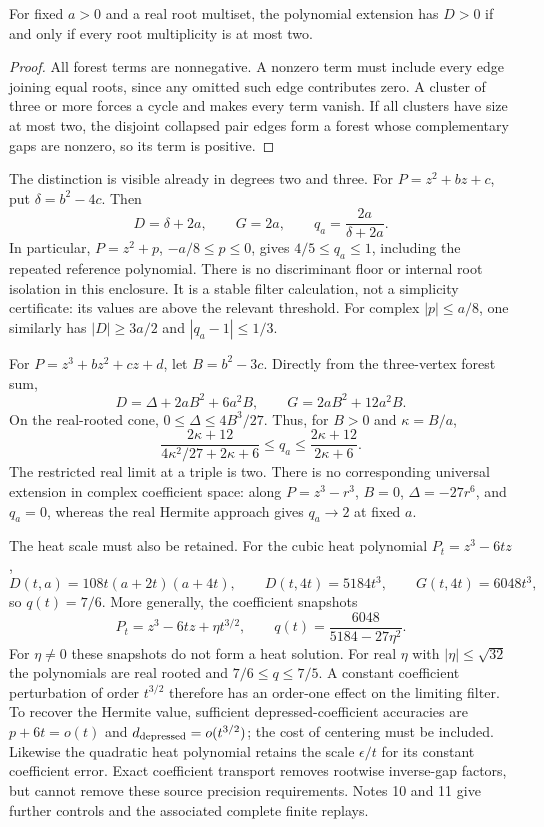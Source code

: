 \begin{lemma}
For fixed $a>0$ and a real root multiset, the polynomial extension has $D>0$
if and only if every root multiplicity is at most two.
\end{lemma}
\begin{proof}
All forest terms are nonnegative. A nonzero term must include every edge
joining equal roots, since any omitted such edge contributes zero. A cluster
of three or more forces a cycle and makes every term vanish. If all clusters
have size at most two, the disjoint collapsed pair edges form a forest whose
complementary gaps are nonzero, so its term is positive.
\end{proof}

The distinction is visible already in degrees two and three. For
$P=z^2+bz+c$, put $\delta=b^2-4c$. Then
\[
 D=\delta+2a,\qquad G=2a,\qquad q_a=\frac{2a}{\delta+2a}.
\]
In particular, $P=z^2+p$, $-a/8\le p\le0$, gives $4/5\le q_a\le1$,
including the repeated reference polynomial. There is no discriminant floor
or internal root isolation in this enclosure. It is a stable filter
calculation, not a simplicity certificate: its values are above the relevant
threshold. For complex $|p|\le a/8$, one similarly has
$|D|\ge3a/2$ and $|q_a-1|\le1/3$.

For $P=z^3+bz^2+cz+d$, let $B=b^2-3c$. Directly from the three-vertex forest
sum,
\[
 D=\Delta+2aB^2+6a^2B,\qquad G=2aB^2+12a^2B.
\]
On the real-rooted cone, $0\le\Delta\le4B^3/27$. Thus, for $B>0$ and
$\kappa=B/a$,
\[
 \frac{2\kappa+12}{4\kappa^2/27+2\kappa+6}
 \le q_a\le\frac{2\kappa+12}{2\kappa+6}.
\]
The restricted real limit at a triple is two. There is no corresponding
universal extension in complex coefficient space: along $P=z^3-r^3$,
$B=0$, $\Delta=-27r^6$, and $q_a=0$, whereas the real Hermite approach gives
$q_a\to2$ at fixed $a$.

The heat scale must also be retained. For the cubic heat polynomial
$P_t=z^3-6tz$,
\[
 D(t,a)=108t(a+2t)(a+4t),\qquad
 D(t,4t)=5184t^3,\qquad G(t,4t)=6048t^3,
\]
so $q(t)=7/6$. More generally, the coefficient snapshots
\[
 P_t=z^3-6tz+\eta t^{3/2},\qquad
 q(t)=\frac{6048}{5184-27\eta^2}.
\]
For $\eta\ne0$ these snapshots do not form a heat solution.
For real $\eta$ with $|\eta|\le\sqrt{32}$ the polynomials are real rooted
and $7/6\le q\le7/5$. A constant coefficient perturbation of order $t^{3/2}$
therefore has an order-one effect on the limiting filter. To recover the
Hermite value, sufficient depressed-coefficient accuracies are
$p+6t=o(t)$ and $d_{\rm depressed}=o(t^{3/2})$; the cost of centering must
be included. Likewise the quadratic heat polynomial retains the scale
$\epsilon/t$ for its constant coefficient error. Exact coefficient transport
removes rootwise inverse-gap factors, but cannot remove these source precision
requirements. Notes 10 and 11 give further controls and the associated
complete finite replays.
